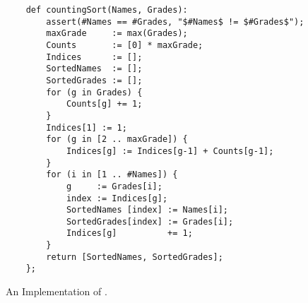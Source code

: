 \begin{figure}[!ht]
\centering
\begin{verbatim}
    def countingSort(Names, Grades):
        assert(#Names == #Grades, "$#Names$ != $#Grades$");
        maxGrade     := max(Grades);
        Counts       := [0] * maxGrade;
        Indices      := [];
        SortedNames  := [];
        SortedGrades := [];
        for (g in Grades) {
            Counts[g] += 1;
        }
        Indices[1] := 1;
        for (g in [2 .. maxGrade]) {
            Indices[g] := Indices[g-1] + Counts[g-1];
        }
        for (i in [1 .. #Names]) {
            g     := Grades[i];
            index := Indices[g];
            SortedNames [index] := Names[i];
            SortedGrades[index] := Grades[i];
            Indices[g]          += 1;
        }
        return [SortedNames, SortedGrades];
    };
\end{verbatim}
\vspace*{-0.3cm}
\caption{An Implementation of .}
\label{fig:counting-sort.stlx}
\end{figure}

